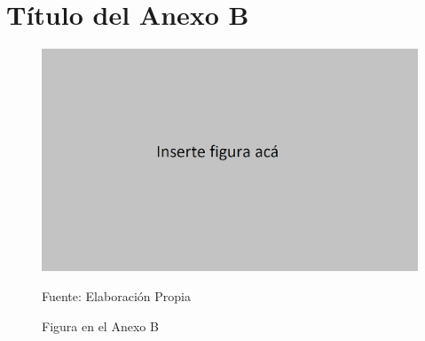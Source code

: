 \chapter{Título del Anexo B}

\begin{figure}[H]
\centering
\includegraphics[width=\linewidth]{03_anexos/00_figuras/02_figura.png}
\caption{Figura en el Anexo B}
\centering
Fuente: Elaboración Propia
\label{fig_a2_ejemplo}
\end{figure}
